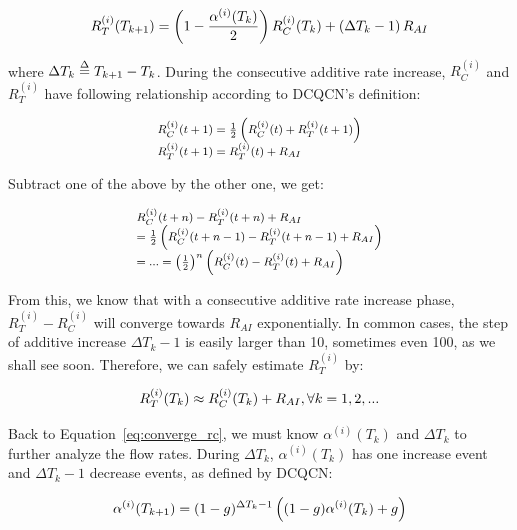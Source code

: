 \begin{equation}
\small
R_T^{(i)}({T_{k + 1}}) = \left( {1 - \frac{{{\alpha ^{(i)}}({T_k})}}{2}} \right)R_C^{(i)}({T_k}) + \left( {\Delta {T_k} - 1} \right){R_{AI}}
\label{eq:converge_rc}
\end{equation}

where $\Delta {T_k} \buildrel \Delta \over = {T_{k + 1}} - {T_k}$. During the consecutive 
additive rate increase, $R_C^{(i)}$ and $R_T^{(i)}$ have following relationship according 
to DCQCN's definition:

\begin{equation}
\small
\begin{array}{l}
R_C^{(i)}(t + 1) = \frac{1}{2}\left( {R_C^{(i)}(t) + R_T^{(i)}(t + 1)} \right)\\
R_T^{(i)}(t + 1) = R_T^{(i)}(t) + {R_{AI}}
\end{array}
\end{equation}

Subtract one of the above by the other one, we get:

\begin{equation}
\small
\begin{array}{l}
R_C^{(i)}(t + n) - R_T^{(i)}(t + n) + {R_{AI}}\\
 = \frac{1}{2}\left( {R_C^{(i)}(t + n - 1) - R_T^{(i)}(t + n - 1) + {R_{AI}}} \right)\\
 = ... = {\left( {\frac{1}{2}} \right)^n}\left( {R_C^{(i)}(t) - R_T^{(i)}(t) + {R_{AI}}} \right)
\end{array}
\end{equation}

From this, we know that with a consecutive additive rate increase phase, $R_T^{(i)} - R_C^{(i)}$
will converge towards $R_{AI}$ exponentially. In common cases, the step of additive increase
$\Delta {T_k} - 1$ is easily larger than 10, sometimes even 100, as we shall see soon. Therefore,
we can safely estimate $R_T^{(i)}$ by:

\begin{equation}
\small
R_T^{(i)}({T_k}) \approx R_C^{(i)}({T_k}) + {R_{AI}},\forall k = 1,2,...
\end{equation}

Back to Equation~\ref{eq:converge_rc}, we must know $\alpha ^{(i)}({T_k})$ and $\Delta T_k$ to 
further analyze the flow rates. During $\Delta T_k$, $\alpha ^{(i)}({T_k})$ has one increase event
and $\Delta T_k - 1$ decrease events, as defined by DCQCN:

\begin{equation}
\small
{\alpha ^{(i)}}({T_{k + 1}}) = {(1 - g)^{\Delta {T_k} - 1}}\left( {(1 - g){\alpha ^{(i)}}({T_k}) + g} \right)
\label{eq:converge_alpha}
\end{equation}

